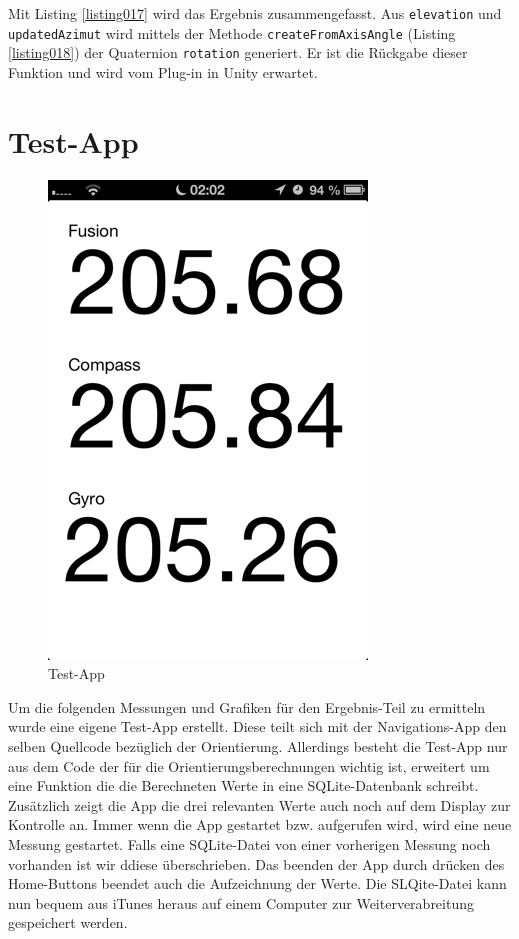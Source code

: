 Mit Listing \ref{listing017} wird das Ergebnis zusammengefasst. Aus \texttt{elevation} und \texttt{updatedAzimut} wird mittels der Methode \texttt{createFromAxisAngle} (Listing \ref{listing018}) der Quaternion \texttt{rotation} generiert. Er ist die Rückgabe dieser Funktion und wird vom Plug-in in Unity erwartet.

\section{Test-App}
\begin{figure}[htb]
\centering
\includegraphics[scale=0.6]{figures/testapp}
\caption{Test-App}
\label{fig:testapp001}
\end{figure}
Um die folgenden Messungen und Grafiken für den Ergebnis-Teil zu ermitteln wurde eine eigene Test-App erstellt. Diese teilt sich mit der Navigations-App den selben Quellcode bezüglich der Orientierung. Allerdings besteht die Test-App nur aus dem Code der für die Orientierungsberechnungen wichtig ist, erweitert um eine Funktion die die Berechneten Werte in eine SQLite-Datenbank schreibt. Zusätzlich zeigt die App die drei relevanten Werte auch noch auf dem Display zur Kontrolle an. Immer wenn die App gestartet bzw. aufgerufen wird, wird eine neue Messung gestartet. Falls eine SQLite-Datei von einer vorherigen Messung noch vorhanden ist wir ddiese überschrieben. Das beenden der App durch drücken des Home-Buttons beendet auch die Aufzeichnung der Werte. Die SLQite-Datei kann nun bequem aus iTunes heraus auf einem Computer zur Weiterverabreitung gespeichert werden.

